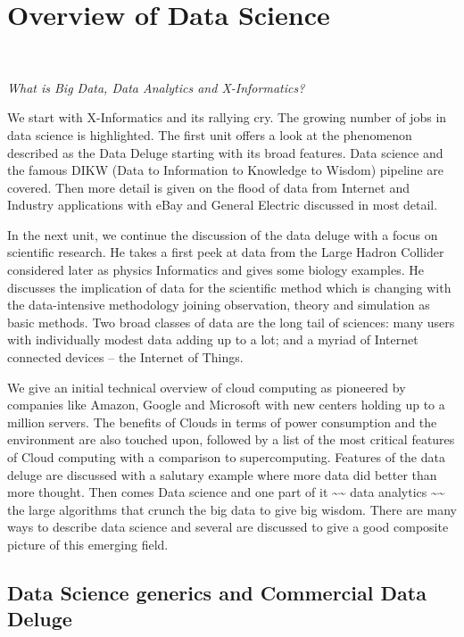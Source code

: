

\chapter{Overview of Data Science}\label{overview-of-data-science}

\FILENAME\

\emph{What is Big Data, Data Analytics and X-Informatics?}

We start with X-Informatics and its rallying cry.
The growing number of jobs in data science is highlighted. The first
unit offers a look at the phenomenon described as the Data Deluge
starting with its broad features. Data science and the famous DIKW (Data
to Information to Knowledge to Wisdom) pipeline are covered. Then more
detail is given on the flood of data from Internet and Industry
applications with eBay and General Electric discussed in most detail.

In the next unit, we continue the discussion of the data deluge with a
focus on scientific research. He takes a first peek at data from the
Large Hadron Collider considered later as physics Informatics and gives
some biology examples. He discusses the implication of data for the
scientific method which is changing with the data-intensive methodology
joining observation, theory and simulation as basic methods. Two broad
classes of data are the long tail of sciences: many users with
individually modest data adding up to a lot; and a myriad of Internet
connected devices -- the Internet of
Things.

We give an initial technical overview of cloud computing as pioneered by
companies like Amazon, Google and Microsoft with new centers holding up
to a million servers. The benefits of Clouds in terms of power
consumption and the environment are also touched upon, followed by a
list of the most critical features of Cloud computing with a comparison
to supercomputing. Features of the data deluge are discussed with a
salutary example where more data did better than more thought. Then
comes Data science and one part of it \textasciitilde{}\textasciitilde{}
data analytics \textasciitilde{}\textasciitilde{} the large algorithms
that crunch the big data to give big wisdom. There are many ways to
describe data science and several are discussed to give a good composite
picture of this emerging field.

\section{Data Science generics and Commercial Data
Deluge}\label{data-science-generics-and-commercial-data-deluge}

